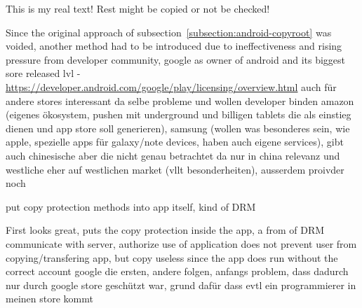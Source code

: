 This is my real text! Rest might be copied or not be checked!

Since the original approach of subsection~\ref{subsection:android-copyroot} was voided, another method had to be introduced due to ineffectiveness and rising pressure from developer community, google as owner of android and its biggest sore released lvl - \url{https://developer.android.com/google/play/licensing/overview.html}
auch für andere stores interessant da selbe probleme und wollen developer binden
amazon (eigenes ökosystem, pushen mit underground und billigen tablets die als einstieg dienen und app store soll generieren), samsung (wollen was besonderes sein, wie apple, spezielle apps für galaxy/note devices, haben auch eigene services), gibt auch chinesische aber die nicht genau betrachtet da nur in china relevanz und westliche eher auf westlichen market (vllt besonderheiten), ausserdem proivder noch
\cite{munteanLicense}


put copy protection methods into app itself, kind of DRM


First looks great, puts the copy protection inside the app, a from of DRM\newline
communicate with server, authorize use of application\newline
does not prevent user from copying/transfering app, but copy useless since the app does run without the correct account\newline
google die ersten, andere folgen, anfangs problem, dass dadurch nur durch google store geschützt war, grund dafür dass evtl ein programmierer in meinen store kommt\newline
